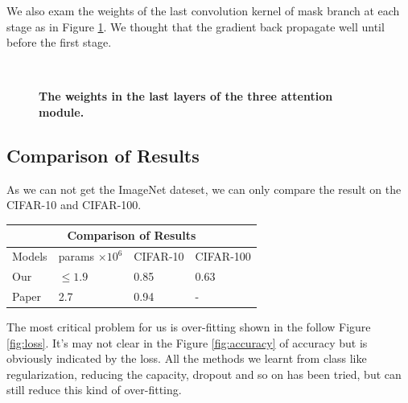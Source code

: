 \documentclass{article}
\newcommand{\mycaption}[2]{\caption[#1]{\textbf{#1.} #2}}
\begin{document}
\begin{multicols}{2}
We also exam the weights of the last convolution kernel of mask branch at each stage as in Figure \ref{fig:hist}. We thought that the gradient back propagate well until before the first stage.
\begin{figure}[H]
  \centering
   \\
  \mycaption{The weights in the last layers of the three attention module}{}
  \label{fig:hist}
\end{figure}

\subsection{Comparison of Results}
As we can not get the ImageNet dateset, we can only compare the result on the 
CIFAR-10 and CIFAR-100. 
\begin{tabular}{ |p{1.4cm}||p{1.4cm}|p{1.4cm}|p{1.4cm}|  }
 \hline
 \multicolumn{4}{|c|}{Comparison of Results} \\
 \hline
 Models & params $\times 10^{6}$  & CIFAR-10 & CIFAR-100 \\
 \hline
 Our & $\leq1.9$ & 0.85 & 0.63 \\
 Paper & 2.7 & 0.94 & - \\
 \hline
\end{tabular}

The most critical problem for us is over-fitting shown in the follow Figure \ref{fig:loss}. It's may not clear in the Figure \ref{fig:accuracy} of accuracy but is obviously indicated by the loss. All the methods we learnt from class like regularization, reducing the capacity, dropout and so on has been tried, but can still reduce this kind of over-fitting.  
 

\end{multicols}
\end{document}
